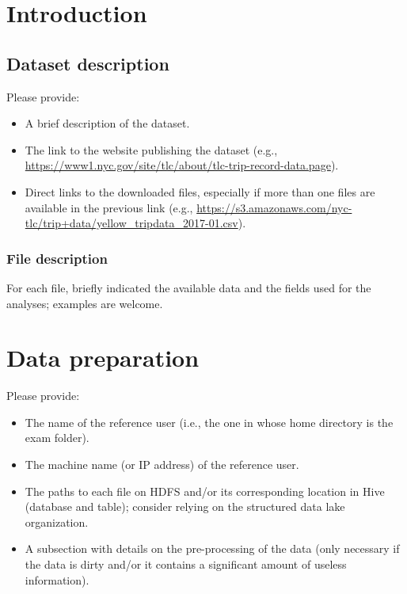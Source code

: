\documentclass[10pt]{article}
\begin{document}
    \section{Introduction}
    \subsection{Dataset description}

    Please provide:
    \begin{itemize}
        \item A brief description of the dataset.
        \item The link to the website publishing the dataset (e.g., \url{https://www1.nyc.gov/site/tlc/about/tlc-trip-record-data.page}).
        \item Direct links to the downloaded files, especially if more than one files are available in the previous link (e.g., \url{https://s3.amazonaws.com/nyc-tlc/trip+data/yellow_tripdata_2017-01.csv}).
    \end{itemize}

    \subsubsection{File description}

    For each file, briefly indicated the available data and the fields used for the analyses; examples are welcome.


    \section{Data preparation}

    Please provide:
    \begin{itemize}
        \item The name of the reference user (i.e., the one in whose home directory is the {\sf exam} folder).
        \item The machine name (or IP address) of the reference user.
        \item The paths to each file on HDFS and/or its corresponding location in Hive (database and table); consider relying on the structured data lake organization.
        \item A subsection with details on the pre-processing of the data (only necessary if the data is dirty and/or it contains a significant amount of useless information).
    \end{itemize}
\end{document}
